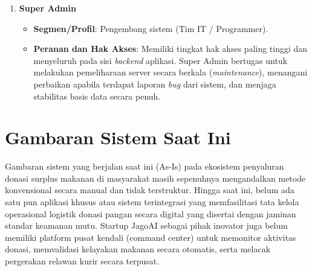 \begin{enumerate}
\begin{itemize}
        \item \textbf{Peranan dan Hak Akses}: Memiliki hak akses dashboard admin untuk memverifikasi keabsahan pendaftaran akun baru secara manual, membekukan atau memblokir akun yang terbukti melakukan penyalahgunaan, menindaklanjuti laporan negatif, serta memantau Dasbor Statistik makro yang menampilkan peta panas (\textit{heatmap}) sebaran wilayah donasi dan kalkulasi SROI keseluruhan.
    \end{itemize}
    \item \textbf{Super Admin}
    \begin{itemize}
        \item \textbf{Segmen/Profil}: Pengembang sistem (Tim IT / Programmer).
        \item \textbf{Peranan dan Hak Akses}: Memiliki tingkat hak akses paling tinggi dan menyeluruh pada sisi \textit{backend} aplikasi. Super Admin bertugas untuk melakukan pemeliharaan server secara berkala (\textit{maintenance}), menangani perbaikan apabila terdapat laporan \textit{bug} dari sistem, dan menjaga stabilitas basis data secara penuh.
    \end{itemize}
\end{enumerate}

\newpage

\section{Gambaran Sistem Saat Ini}
Gambaran sistem yang berjalan saat ini (As-Is) pada ekosistem penyaluran donasi surplus makanan di masyarakat masih sepenuhnya mengandalkan metode konvensional secara manual dan tidak terstruktur. Hingga saat ini, belum ada satu pun aplikasi khusus atau sistem terintegrasi yang memfasilitasi tata kelola operasional logistik donasi pangan secara digital yang disertai dengan jaminan standar keamanan mutu. Startup JagoAI sebagai pihak inovator juga belum memiliki platform pusat kendali (command center) untuk memonitor aktivitas donasi, memvalidasi kelayakan makanan secara otomatis, serta melacak pergerakan relawan kurir secara terpusat.
